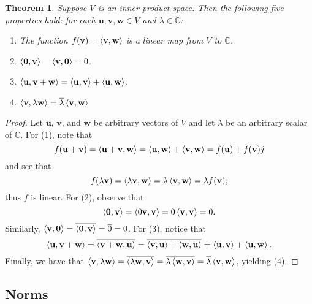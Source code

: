 \documentclass[11pt]{article}
\renewcommand{\vec}[1]{\mathbf{#1}}
\newcommand{\conjugate}[1]{\overline{#1}}
\newtheorem{theorem}{Theorem}
\begin{document}
\begin{theorem}
	Suppose $V$ is an inner product space. Then the following five properties hold: for each $\vec{u}, \vec{v}, \vec{w} \in V$ and $\lambda \in \mathbb{C}$:
	\begin{enumerate}
		\item The function $f(\vec{v}) = \ev{\vec{v}, \vec{w}}$ is a linear map from $V$ to $\mathbb{C}$.
		\item $\ev{\vec{0}, \vec{v}} = \ev{\vec{v}, \vec{0}} = 0$.
		\item $\ev{\vec{u}, \vec{v} + \vec{w}} = \ev{\vec{u}, \vec{v}} + \ev{\vec{u}, \vec{w}}$.
		\item $\ev{\vec{v}, \lambda \vec{w}} = \conjugate{\lambda} \ev{\vec{v}, \vec{w}}$
	\end{enumerate}
\end{theorem}
\begin{adjustwidth}{1cm}{}
	\begin{proof}
		Let $\vec{u}$, $\vec{v}$, and $\vec{w}$ be arbitrary vectors of $V$ and let $\lambda$ be an arbitrary scalar of $\mathbb{C}$. For (1), note that
		\[
			f(\vec{u} + \vec{v}) = \ev{\vec{u} + \vec{v}, \vec{w}} = \ev{\vec{u}, \vec{w}} + \ev{\vec{v}, \vec{w}} = f(\vec{u}) + f(\vec{v})j
		\]
		and see that
		\[
			f(\lambda \vec{v}) = \ev{\lambda \vec{v}, \vec{w}} = \lambda \ev{\vec{v}, \vec{w}} = \lambda f(\vec{v});
		\]
		thus $f$ is linear. For (2), observe that
		\[
			\ev{\vec{0}, \vec{v}} = \ev{0 \vec{v}, \vec{v}} = 0 \ev{\vec{v}, \vec{v}} = 0.
		\]
		Similarly, $\ev{\vec{v}, \vec{0}} = \conjugate{\ev{\vec{0}, \vec{v}}} = \conjugate{0} = 0$. For (3), notice that
		\[
			\ev{\vec{u}, \vec{v} + \vec{w}} = \conjugate{\ev{\vec{v} + \vec{w}, \vec{u}}} = \conjugate{\ev{\vec{v}, \vec{u}} + \ev{\vec{w}, \vec{u}}} = \ev{\vec{u}, \vec{v}} + \ev{\vec{u}, \vec{w}}.
		\]
		Finally, we have that $\ev{\vec{v}, \lambda \vec{w}} = \conjugate{\ev{\lambda \vec{w}, \vec{v}}} = \conjugate{\lambda \ev{\vec{w}, \vec{v}}} = \conjugate{\lambda} \ev{\vec{v}, \vec{w}}$, yielding (4).
	\end{proof}
\end{adjustwidth}


\subsection{Norms}
\end{document}
